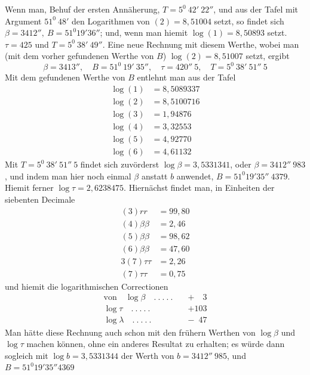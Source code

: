 %
\par\indent Wenn man, Behuf der ersten Annäherung, \(T=5^0\ 42'\ 22''\), und aus der Tafel mit Argument \(51^0\ 48'\) den Logarithmen von \((2)=8{,}51004\) setzt, so findet sich \(\beta=3412'',\ B=51^0 19'36''\); und, wenn man hiemit \(\log(1)=8{,}50893\) setzt. \(\tau=425\) und \(T=5^0\ 38'\ 49''\). Eine neue Rechnung mit diesem Werthe, wobei man (mit dem vorher gefundenen Werthe von \(B\)) \(\log(2)=8{,}51007\) setzt, ergibt
\[
\beta=3413'',\quad B=51^0\ 19'\ 35'',\quad\tau=420''\ 5,\quad T=5^0\ 38'\ 51''\ 5
\]
Mit dem gefundenen Werthe von \(B\) entlehnt man aus der Tafel
\[
\begin{aligned}
\log(1)&=8{,}5089337\\
\log(2)&=8{,}5100716\\
\log(3)&=1{,}94876\\
\log(4)&=3{,}32553\\
\log(5)&=4{,}92770\\
\log(6)&=4{,}61132
\end{aligned}
\]
Mit \(T=5^0\ 38'\ 51''\ 5\) findet sich zuvörderst \(\log\beta=3{,}5331341\), oder \(\beta=3412''\ 983\), und indem man hier noch einmal \(\beta\) anstatt \(b\) anwendet, \(B=51^0 19'35''\ 4379\). Hiemit ferner \(\log\tau=2{,}6238475\). Hiernächst findet man, in Einheiten der siebenten Decimale
\[
\begin{aligned}
(3)rr&=99{,}80\\
(4)\beta\beta&=2{,}46\\
(5)\beta\beta&=98{,}62\\
(6)\beta\beta&=47{,}60\\
3(7)\tau\tau&=2{,}26\\
(7)\tau\tau&=0{,}75
\end{aligned}
\]
und hiemit die logarithmischen Correctionen
\[
\begin{aligned}
\text{von}\quad\log\beta\quad .\ .\ .\ .\ .\quad&+\phantom{10}3\\
\log\tau\quad .\ .\ .\ .\ .\quad&+103\\
\log\lambda\quad .\ .\ .\ .\ .\quad&-\phantom{1}47
\end{aligned}
\]
Man hätte diese Rechnung auch schon mit den frühern Werthen von \(\log\beta\) und \(\log\tau\) machen können, ohne ein anderes Resultat zu erhalten; es würde dann sogleich mit \(\log b=3{,}5331344\) der Werth von \(b=3412''\ 985\), und \(B=51^0 19'35''4369\)
